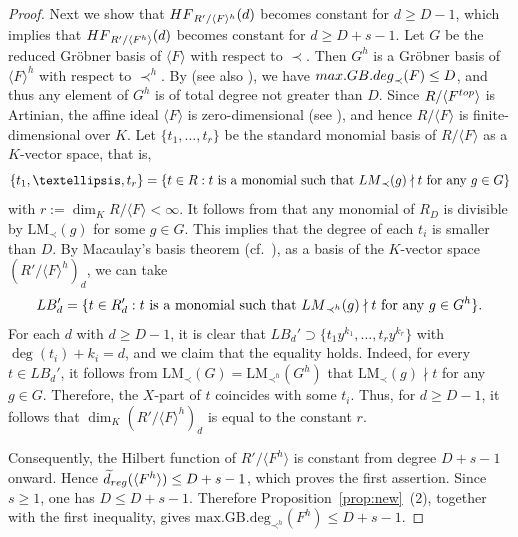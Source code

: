 \documentclass{article}
\theoremstyle{definition}
\theoremstyle{plain}
\theoremstyle{plain}
\theoremstyle{plain}
\theoremstyle{plain}
\numberwithin{equation}{subsection}
\begin{document}
\begin{proof}
Next we show that ${\rm HF}_{R'/\langle F\rangle^h}(d)$ becomes constant for $d\geq D-1$, which implies that ${\rm HF}_{R'/\langle F^h\rangle}(d)$ becomes constant for $d\geq D+s-1$. 
Let $G$ be the reduced Gr\"obner basis of $\langle F\rangle$ with respect to $\prec$. 
Then $G^h$ is a Gr\"obner basis of $\langle F\rangle^h$ with respect to $\prec^h$. 
By \cite[Remark 15]{CG20} (see also \cite[Remark 9]{KY}), we have ${\rm max.GB.deg}_{\prec}(F)\leq D$, and thus any element of $G^h$ is of total degree not greater than $D$. 
Since $R/\langle F^{\rm top}\rangle$ is Artinian, the affine ideal $\langle F \rangle$ is zero-dimensional (see \cite[Remark 6]{KY}), and hence $R/\langle F \rangle$ is finite-dimensional over $K$.
Let $\{t_1,\ldots,t_r\}$ be the standard monomial basis of $R/\langle F\rangle$ as a $K$-vector space, that is,
\[
\{t_1,\ldots,t_r\}=\{t \in R: \mbox{$t$ is a monomial such that } {\rm LM}_{\prec}(g) \nmid  t \mbox{ for any }g\in G\}
\]
with $r:= \dim_K R/\langle F \rangle < \infty$.
It follows from \cite[Lemma 3]{KY} that any monomial of $R_D$ is divisible by $\mathrm{LM}_{\prec}(g)$ for some $g \in G$.
This implies that the degree of each $t_i$ is smaller than $D$.
By Macaulay's basis theorem (cf.\ \cite[Theorem 1.5.7]{KR1}), as a basis of the $K$-vector space $(R'/\langle F\rangle^h)_d$, we can take
\[
LB_d'=\{t\in R'_d : \mbox{$t$ is a monomial such that } {\rm LM}_{\prec^h}(g) \nmid t \mbox{ for any } g\in G^h\}.
\]
For each $d$ with $d\geq D-1$, it is clear that $LB_{d}' \supset \{t_1y^{k_1},\ldots,t_ry^{k_r}\}$ with $\deg(t_i)+k_i=d$, and we claim that the equality holds.
Indeed, for every $t \in LB_d'$, it follows from $\mathrm{LM}_{\prec}(G) = \mathrm{LM}_{\prec^h}(G^h)$ that $\mathrm{LM}_{\prec}(g)\nmid t$ for any $g \in G$.
Therefore, the $X$-part of $t$ coincides with some $t_i$.
Thus, for $d\geq D-1$, it follows that {$\dim_K (R'/\langle F\rangle^h)_d$} is equal to the constant $r$.

Consequently, the Hilbert function of $R'/\langle F^h\rangle$ is constant from degree $D+s-1$ onward.
Hence $\widetilde d_{\rm reg}(\langle F^h\rangle)\leq D+s-1$, which proves the first assertion.
Since $s\geq1$, one has $D\leq D+s-1$.
Therefore Proposition~\ref{prop:new}~{\rm (2)}, together with the
first inequality, gives $ \mathrm{max.GB.deg}_{\prec^h}(F^h) \leq D+s-1$.
\end{proof}
\end{document}
